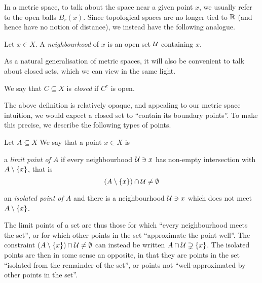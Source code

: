 \documentclass[11pt]{article}
\begin{document}
In a metric space, to talk about the space near a given point $x$, we usually refer to the open balls $B_r(x)$. Since topological spaces are no longer tied to $\mathbb{R}$ (and hence have no notion of distance), we instead have the following analogue.
\begin{definition}[Neighbourhood]
    Let $x \in X$. A \emph{neighbourhood} of $x$ is an open set $\mathcal{U}$ containing $x$.
\end{definition}
As a natural generalisation of metric spaces, it will also be convenient to talk about closed sets, which we can view in the same light.
\begin{definition}
    We say that $C \subseteq X$ is \emph{closed} if $C^c$ is open.
\end{definition}
The above definition is relatively opaque, and appealing to our metric space intuition, we would expect a closed set to ``contain its boundary points''. To make this precise, we describe the following types of points.
\begin{definition}
    Let $A \subseteq X$ We say that a point $x \in X$ is
    \begin{enum}
        \item a \emph{limit point of $A$} if every neighbourhood $\mathcal{U} \ni x$ has non-empty intersection with $A \setminus \left\{  x  \right\}$, that is 
        $$
            (A \setminus \left\{  x  \right\}) \cap \mathcal{U} \neq \emptyset
        $$
        \item an \emph{isolated point of $A$} and there is a neighbourhood $\mathcal{U} \ni x$ which does not meet $A \setminus \left\{  x  \right\}$.
    \end{enum}
\end{definition}
The limit points of a set are thus those for which ``every neighbourhood meets the set'', or for which other points in the set ``approximate the point well''. The constraint $(A \setminus \left\{  x  \right\}) \cap \mathcal{U} \neq \emptyset$ can instead be written $A \cap \mathcal{U} \supsetneq \left\{  x  \right\}$. The isolated points are then in some sense an opposite, in that they are points in the set ``isolated from the remainder of the set'', or points not ``well-approximated by other points in the set''.
\end{document}
